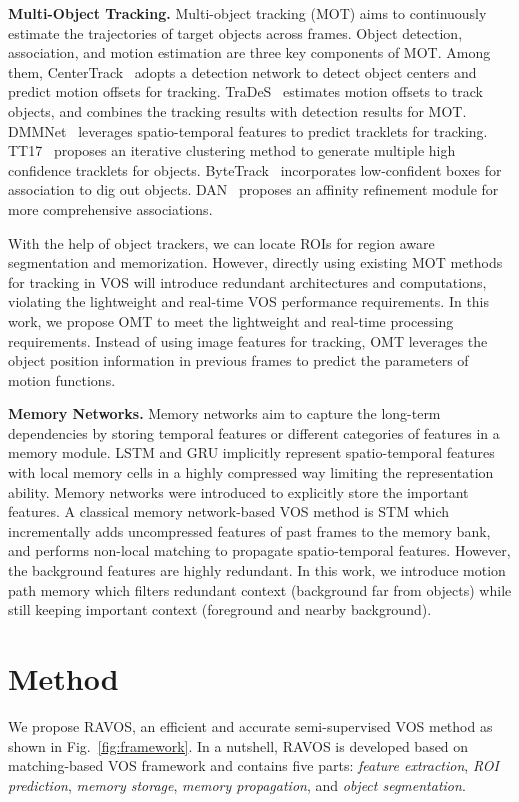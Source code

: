 \documentclass[journal]{IEEEtran}
\begin{document}
\textbf{Multi-Object Tracking.} Multi-object tracking (MOT) aims to continuously estimate the trajectories of target objects across frames. Object detection, association, and motion estimation are three key components of MOT. Among them, CenterTrack~\cite{CenterTrack} adopts a detection network to detect object centers and predict motion offsets for tracking. TraDeS~\cite{TraDeS} estimates motion offsets to track objects, and combines the tracking results with detection results for MOT. DMMNet~\cite{DMMNet} leverages spatio-temporal features to predict tracklets for tracking. TT17~\cite{TT17} proposes an iterative clustering method to generate multiple high confidence tracklets for objects. ByteTrack~\cite{ByteTrack} incorporates low-confident boxes for association to dig out objects. DAN~\cite{DAN} proposes an affinity refinement module for more comprehensive associations. 


With the help of object trackers, we can locate ROIs for region aware segmentation and memorization. However, directly using existing MOT methods for tracking in VOS will introduce redundant architectures and computations, violating the lightweight and real-time VOS performance requirements. In this work, we propose OMT to meet the lightweight and real-time processing requirements. Instead of using image features for tracking, OMT leverages the object position information in previous frames to predict the parameters of motion functions.



\textbf{Memory Networks.} Memory networks aim to capture the long-term dependencies by storing temporal features or different categories of features in a memory module. LSTM \cite{LSTM} and GRU \cite{GRU} implicitly represent spatio-temporal features with local memory cells in a highly compressed way limiting the representation ability. Memory networks \cite{MemNet} were introduced to explicitly store the important features. A classical memory network-based VOS method is STM \cite{STM} which incrementally adds uncompressed features of past frames to the memory bank, and performs non-local matching to propagate spatio-temporal features. However, the background features are highly redundant. In this work, we introduce motion path memory which filters redundant context (background far from objects) while still keeping important context (foreground and nearby background).





\section{Method}
We propose RAVOS, an efficient and accurate semi-supervised VOS method as shown in Fig.~\ref{fig:framework}. In a nutshell, RAVOS is developed based on matching-based VOS framework and contains five parts: \emph{feature extraction}, \emph{ROI prediction}, \emph{memory storage}, \emph{memory propagation}, and \emph{object segmentation}.
\end{document}
